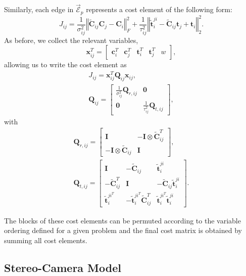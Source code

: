 \documentclass[lettersize,journal]{IEEEtran}
\newcommand{\EdgeSet}{\vec{\bm{\mathcal{E}}}}
\begin{document}
Similarly, each edge in $\EdgeSet_p$ represents a cost element of the following form:
\begin{equation}
	J_{ij} = \frac{1}{\sigma^2_{ij}} \left\Vert \tilde{\bm{C}}_{ij}\bm{C}_j - \bm{C}_i\right\Vert_F^2 + \frac{1}{\tau^2_{ij}} \left\Vert \tilde{\bm{t}}^{ji}_{i} - \tilde{\bm{C}}_{ij}\bm{t}_j + \bm{t}_i \right\Vert_2^2.
\end{equation}
As before, we collect the relevant variables,
\begin{equation*}
	\bm{x}_{ij}^T = \begin{bmatrix} \bm{c}_i^T&\bm{c}_j^T  & \bm{t}_i^T & \bm{t}_j^T & w\end{bmatrix},
\end{equation*}
allowing us to write the cost element as
\begin{gather*}
	J_{ij}= \bm{x}_{ij}^T\bm{Q}_{ij}\bm{x}_{ij}, \\
	\bm{Q}_{ij} = \begin{bmatrix}
		\frac{1}{\sigma^2_{ij}}\bm{Q}_{r,ij} & \bm{0}\\
		\bm{0}&\frac{1}{\tau^2_{ij}}\bm{Q}_{t,ij}
	\end{bmatrix},
\end{gather*}
with
\begin{gather*}
	\bm{Q}_{r,ij}=\begin{bmatrix}
		\bm{I}  &  -\bm{I}\otimes\tilde{\bm{C}}_{ij}^T\\
		-\bm{I}\otimes\tilde{\bm{C}}_{ij} & \bm{I}
	\end{bmatrix}, \\ 
	\bm{Q}_{t,ij}=\begin{bmatrix}
		\bm{I}  &  -\tilde{\bm{C}}_{ij} & \tilde{\bm{t}}_{i}^{ji}\\
		-\tilde{\bm{C}}_{ij}^T & \bm{I} & -\tilde{\bm{C}}_{ij}\tilde{\bm{t}}_{i}^{ji}\\
		\tilde{\bm{t}}_{i}^{ji^T} &  -\tilde{\bm{t}}_{i}^{ji^T}\tilde{\bm{C}}_{ij}^T & \tilde{\bm{t}}_{i}^{ji^T} \tilde{\bm{t}}_{i}^{ji}
	\end{bmatrix}.
\end{gather*}

The blocks of these cost elements can be permuted according to the variable ordering defined for a given problem and the final cost matrix is obtained by summing all cost elements.


\subsection{Stereo-Camera Model}\label{App:stereo}
\end{document}
